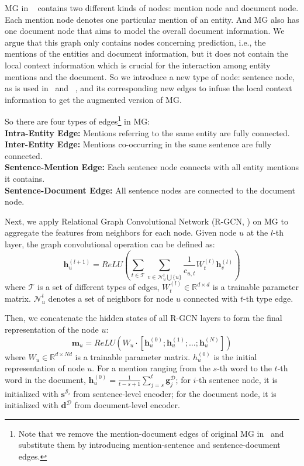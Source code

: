 \documentclass[11pt,a4paper]{article}
\begin{document}
MG in ~\citet{GAIN} contains two different kinds of nodes: mention node and document node. Each mention node denotes one particular mention of an entity. And MG also has one document node that aims to model the overall document information. We argue that this graph only contains nodes concerning prediction, i.e., the mentions of the entities and document information, but it does not contain the local context information which is crucial for the interaction among entity mentions and the document. So we introduce a new type of node: sentence node, as is used in~\citet{EoG} and ~\citet{GLRE}, and its corresponding new edges to infuse the local context information to get the augmented version of MG.

So there are four types of edges\footnote{Note that we remove the mention-document edges of original MG in~\citep{GAIN} and substitute them by introducing mention-sentence and sentence-document edges.} in MG: \\
\noindent
\textbf{Intra-Entity Edge:} Mentions referring to the same entity are fully connected. \\
\noindent
\textbf{Inter-Entity Edge:} Mentions co-occurring in the same sentence are fully connected. \\
\noindent
\textbf{Sentence-Mention Edge:} Each sentence node connects with all entity mentions it contains. \\
\noindent
\noindent
\textbf{Sentence-Document Edge:} All sentence nodes are connected to the document node.

Next, we apply Relational Graph Convolutional Network (R-GCN, \citealp{RGCN}) on MG to aggregate the features from neighbors for each node. Given node $u$ at the $l$-th layer, the graph convolutional operation can be defined as:
\begin{equation}
       \textbf{h}_{u}^{(l + 1)} = ReLU \left(\sum_{t\in\mathcal{T}}\sum_{v\in\mathcal{N}^{t}_{u}\bigcup \{u\}}  \frac{1}{c_{u,t}}W^{(l)}_t \textbf{h}_{v}^{(l)}\right)
\end{equation}
where $\mathcal{T}$ is a set of different types of edges, $W^{(l)}_t\in \mathbb{R}^{d\times d}$ is a trainable parameter matrix.
$\mathcal{N}^{t}_{u}$ denotes a set of neighbors for node $u$ connected with $t$-th type edge.

Then, we concatenate the hidden states of all R-GCN layers to form the final representation of the node $u$:
\begin{equation}
    \textbf{m}_u = ReLU(W_u \cdot [\textbf{h}_{u}^{(0)}; \textbf{h}_{u}^{(1)}; \ldots; \textbf{h}_{u}^{(N)}])
\end{equation}
where $W_u \in \mathbb{R}^{d\times Nd}$ is a trainable parameter matrix. $h^{(0)}_u$ is the initial representation of node $u$. For a mention ranging from the $s$-th word to the $t$-th word in the document, $\textbf{h}^{(0)}_u = \frac{1}{t-s+1} \sum_{j=s}^{t} \textbf{g}^{\mathcal{D}}_{j}$; for $i$-th sentence node, it is initialized with $\textbf{s}^{\mathcal{S}_i}$ from sentence-level encoder; for the document node, it is initialized with $\textbf{d}^{\mathcal{D}}$ from document-level encoder.
\end{document}
